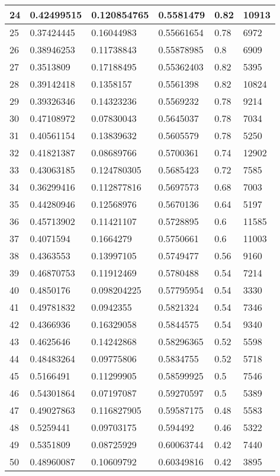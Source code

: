 \begin{longtable}{|l|l|l|l|l|l|}
24 & 0.42499515 & 0.120854765 & 0.5581479 & 0.82 & 10913 \\ \hline 
25 & 0.37424445 & 0.16044983 & 0.55661654 & 0.78 & 6972 \\ \hline 
26 & 0.38946253 & 0.11738843 & 0.55878985 & 0.8 & 6909 \\ \hline 
27 & 0.3513809 & 0.17188495 & 0.55362403 & 0.82 & 5395 \\ \hline 
28 & 0.39142418 & 0.1358157 & 0.5561398 & 0.82 & 10824 \\ \hline 
29 & 0.39326346 & 0.14323236 & 0.5569232 & 0.78 & 9214 \\ \hline 
30 & 0.47108972 & 0.07830043 & 0.5645037 & 0.78 & 7034 \\ \hline 
31 & 0.40561154 & 0.13839632 & 0.5605579 & 0.78 & 5250 \\ \hline 
32 & 0.41821387 & 0.08689766 & 0.5700361 & 0.74 & 12902 \\ \hline 
33 & 0.43063185 & 0.124780305 & 0.5685423 & 0.72 & 7585 \\ \hline 
34 & 0.36299416 & 0.112877816 & 0.5697573 & 0.68 & 7003 \\ \hline 
35 & 0.44280946 & 0.12568976 & 0.5670136 & 0.64 & 5197 \\ \hline 
36 & 0.45713902 & 0.11421107 & 0.5728895 & 0.6 & 11585 \\ \hline 
37 & 0.4071594 & 0.1664279 & 0.5750661 & 0.6 & 11003 \\ \hline 
38 & 0.4363553 & 0.13997105 & 0.5749477 & 0.56 & 9160 \\ \hline 
39 & 0.46870753 & 0.11912469 & 0.5780488 & 0.54 & 7214 \\ \hline 
40 & 0.4850176 & 0.098204225 & 0.57795954 & 0.54 & 3330 \\ \hline 
41 & 0.49781832 & 0.0942355 & 0.5821324 & 0.54 & 7346 \\ \hline 
42 & 0.4366936 & 0.16329058 & 0.5844575 & 0.54 & 9340 \\ \hline 
43 & 0.4625646 & 0.14242868 & 0.58296365 & 0.52 & 5598 \\ \hline 
44 & 0.48483264 & 0.09775806 & 0.5834755 & 0.52 & 5718 \\ \hline 
45 & 0.5166491 & 0.11299905 & 0.58599925 & 0.5 & 7546 \\ \hline 
46 & 0.54301864 & 0.07197087 & 0.59270597 & 0.5 & 5389 \\ \hline 
47 & 0.49027863 & 0.116827905 & 0.59587175 & 0.48 & 5583 \\ \hline 
48 & 0.5259441 & 0.09703175 & 0.594492 & 0.46 & 5322 \\ \hline 
49 & 0.5351809 & 0.08725929 & 0.60063744 & 0.42 & 7440 \\ \hline 
50 & 0.48960087 & 0.10609792 & 0.60349816 & 0.42 & 3895 \\ \hline 
\end{longtable}